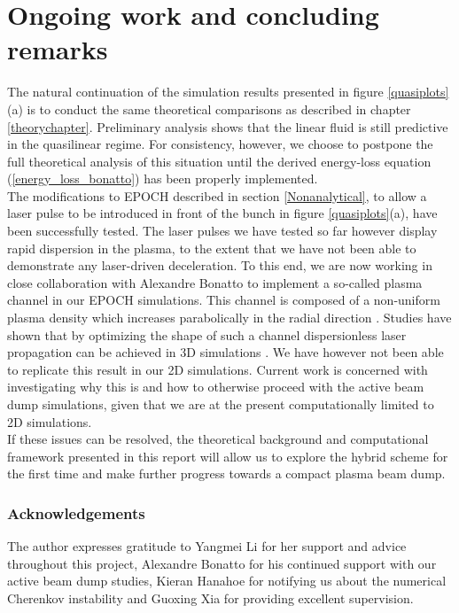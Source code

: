\chapter{Ongoing work and concluding remarks}
The natural continuation of the simulation results presented in figure \ref{quasiplots}(a) is to conduct the same theoretical comparisons as described in chapter \ref{theorychapter}. Preliminary analysis shows that the linear fluid is still predictive in the quasilinear regime. For consistency, however, we choose to postpone the full theoretical analysis of this situation until the derived energy-loss equation (\ref{energy_loss_bonatto}) has been properly implemented. \\
\indent The modifications to EPOCH described in section \ref{Nonanalytical}, to allow a laser pulse to be introduced in front of the bunch in figure \ref{quasiplots}(a), have been successfully tested. The laser pulses we have tested so far however display rapid dispersion in the plasma, to the extent that we have not been able to demonstrate any laser-driven deceleration. To this end, we are now working in close collaboration with Alexandre Bonatto to implement a so-called plasma channel in our EPOCH simulations. This channel is composed of a non-uniform plasma density which increases parabolically in the radial direction . Studies have shown that by optimizing the shape of such a channel dispersionless laser propagation can be achieved in 3D simulations \cite{Bonatto2015, PlasmaChannel}. We have however not been able to replicate this result in our 2D simulations. Current work is concerned with investigating why this is and how to otherwise proceed with the active beam dump simulations, given that we are at the present computationally limited to 2D simulations.\\
\indent If these issues can be resolved, the theoretical background and computational framework presented in this report will allow us to explore the hybrid scheme for the first time and make further progress towards a compact plasma beam dump. 
\vfill 
\subsection*{Acknowledgements}
The author expresses gratitude to Yangmei Li for her support and advice throughout this project, Alexandre Bonatto for his continued support with our active beam dump studies, Kieran Hanahoe for notifying us about the numerical Cherenkov instability and Guoxing Xia for providing excellent supervision.  